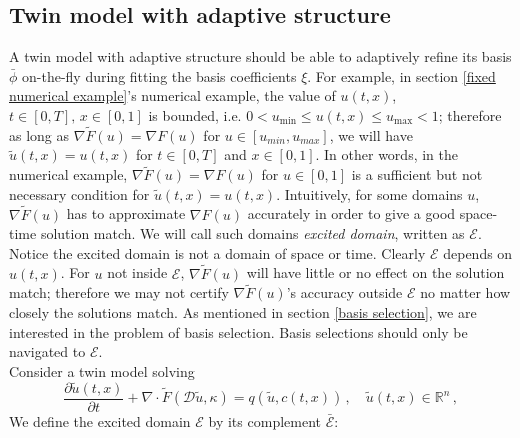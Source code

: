 \documentclass[a4paper,onecolumn]{article}
\newtheorem{definition}{Definition}
\theoremstyle{remark}
\begin{document}
\subsection{Twin model with adaptive structure}
\label{adaptive}
A twin model with adaptive structure should be able to adaptively
refine its basis $\bar{\phi}$ on-the-fly during fitting the basis coefficients $\xi$.
For example, in section \ref{fixed numerical example}'s numerical example,
the value of $u(t,x)$, $t\in[0,T],\,x\in[0,1]$ is bounded, i.e.
$0< u_{\min}\le u(t,x)\le u_{\max} < 1$; therefore as long as 
$\nabla\tilde{F}(u) = \nabla F(u)$ for $u\in[u_{min},u_{max}]$, we will have
$\tilde{u}(t,x) = u(t,x)$ for $t\in[0,T]$ and $x\in[0,1]$.
In other words, in the numerical example, $\nabla \tilde{F}(u) = \nabla F(u)$ for $u\in [0,1]$
is a sufficient but not necessary condition
for $\tilde{u}(t,x) = u(t,x)$. 
Intuitively, for some domains $u$, $\nabla \tilde{F}(u)$ has to approximate $\nabla F(u)$
accurately in order to give a good space-time solution match.
We will call such domains \emph{excited domain}, written as $\mathcal{E}$. 
Notice the excited domain is not a domain of space or time.  
Clearly $\mathcal{E}$ depends on $u(t,x)$.
For $u$ not inside $\mathcal{E}$,
$\nabla \tilde{F}(u)$ will have little or no effect on the solution match; therefore
we may not certify $\nabla \tilde{F}(u)$'s accuracy outside $\mathcal{E}$
no matter how closely the solutions match.
As mentioned in section \ref{basis selection}, we are interested in the problem of basis
selection. Basis selections should only be navigated to $\mathcal{E}$.\\

\noindent Consider a twin model solving
\begin{equation}
    \frac{\partial\tilde{u}(t,x)}{\partial t} + \nabla \cdot 
    \tilde{F}(\mathcal{D} \tilde{u}, \kappa) 
    = q(\tilde{u},c(t,x))\,, \quad \tilde{u}(t,x) \in \mathbb{R}^n\,,
    \label{twin equation def}
\end{equation}
We define the excited domain $\mathcal{E}$ by its complement $\bar{\mathcal{E}}$:\\
\\
\end{document}
